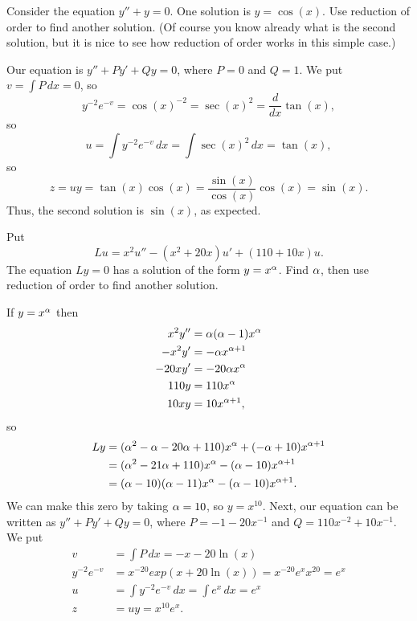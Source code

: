 \documentclass[a4paper]{amsart}
\begin{document}
\begin{exercise}\label{ex-reduction-b}
 Consider the equation $y''+y=0$.  One solution is $y=\cos(x)$.  Use
 reduction of order to find another solution.  (Of course you know
 already what is the second solution, but it is nice to see how
 reduction of order works in this simple case.)
\end{exercise}
\begin{solution}
 Our equation is $y''+Py'+Qy=0$, where $P=0$ and $Q=1$.  We put
 $v=\int P\,dx=0$, so
 \[ y^{-2}e^{-v} = \cos(x)^{-2} = \sec(x)^2 = 
     \frac{d}{dx}\tan(x),
 \]
 so
 \[ u = \int y^{-2}e^{-v}\,dx = \int \sec(x)^2\,dx = \tan(x), \]
 so 
 \[ z = uy = \tan(x)\cos(x) = \frac{\sin(x)}{\cos(x)}\cos(x) 
      = \sin(x).
 \]
 Thus, the second solution is $\sin(x)$, as expected.
\end{solution}

\begin{exercise}\label{ex-reduction-c}
 Put 
 \[ Lu = x^2u'' - (x^2+20x)u' + (110+10x)u. \]
 The equation $Ly=0$ has a solution of the form $y=x^\alpha$.  Find
 $\alpha$, then use reduction of order to find another solution.
\end{exercise}
\begin{solution}
 If $y=x^\alpha$ then
 \begin{align*}
  x^2y'' &= \alpha(\alpha-1)x^\alpha \\
  -x^2y' &= -\alpha x^{\alpha+1} \\
  -20xy' &= -20\alpha x^\alpha \\
  110y   &= 110 x^\alpha \\
  10xy   &= 10 x^{\alpha+1},
 \end{align*}
 so
 \begin{align*}
  Ly &= (\alpha^2-\alpha-20\alpha+110)x^\alpha + (-\alpha+10)x^{\alpha+1} \\
     &= (\alpha^2-21\alpha+110)x^\alpha-(\alpha-10)x^{\alpha+1} \\
     &= (\alpha-10)(\alpha-11)x^{\alpha}-(\alpha-10)x^{\alpha+1}.
 \end{align*}
 We can make this zero by taking $\alpha=10$, so $y=x^{10}$.  Next, our
 equation can be written as $y''+Py'+Qy=0$, where $P=-1-20x^{-1}$ and
 $Q=110x^{-2}+10x^{-1}$.  We put 
 \begin{align*}
  v &= \int P\,dx = -x-20\ln(x) \\
  y^{-2}e^{-v} &= x^{-20}exp(x+20\ln(x)) 
                = x^{-20} e^x x^{20} = e^x \\
  u &= \int y^{-2}e^{-v}\,dx = \int e^x\,dx = e^x \\
  z &= uy = x^{10}e^x.
 \end{align*}
\end{solution}
\end{document}

